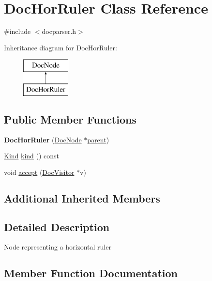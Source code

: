 \hypertarget{class_doc_hor_ruler}{}\section{Doc\+Hor\+Ruler Class Reference}
\label{class_doc_hor_ruler}


{\ttfamily \#include $<$docparser.\+h$>$}

Inheritance diagram for Doc\+Hor\+Ruler\+:\begin{figure}[H]
\begin{center}
\leavevmode
\includegraphics[height=2.000000cm]{class_doc_hor_ruler}
\end{center}
\end{figure}
\subsection*{Public Member Functions}
\begin{DoxyCompactItemize}
\item 
\mbox{\label{class_doc_hor_ruler_a441230a651166279882a4bee81f4eab4}} 
{\bfseries Doc\+Hor\+Ruler} (\mbox{\hyperlink{class_doc_node}{Doc\+Node}} $\ast$\mbox{\hyperlink{class_doc_node_a73e8ad29a91cfceb0968eb00db71a23d}{parent}})
\item 
\mbox{\hyperlink{class_doc_node_aebd16e89ca590d84cbd40543ea5faadb}{Kind}} \mbox{\hyperlink{class_doc_hor_ruler_a83e7a63cc940456a77e1774727089d18}{kind}} () const
\item 
void \mbox{\hyperlink{class_doc_hor_ruler_abd8d0ca3ec21f2ad20719c3840724118}{accept}} (\mbox{\hyperlink{class_doc_visitor}{Doc\+Visitor}} $\ast$v)
\end{DoxyCompactItemize}
\subsection*{Additional Inherited Members}


\subsection{Detailed Description}
Node representing a horizontal ruler 

\subsection{Member Function Documentation}
\mbox{\label{class_doc_hor_ruler_abd8d0ca3ec21f2ad20719c3840724118}} 
